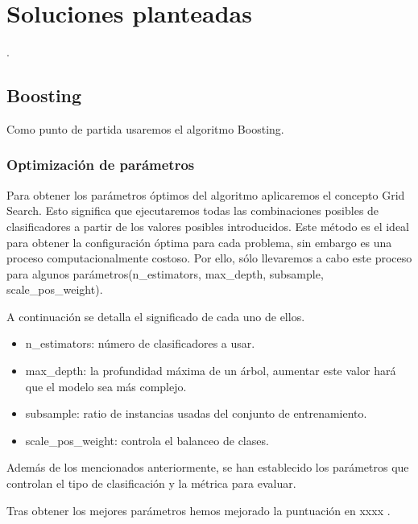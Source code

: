 \chapter{Soluciones planteadas}.
\section{Boosting}
Como punto de partida usaremos el algoritmo Boosting.
\subsection{Optimización de parámetros}
Para obtener los parámetros óptimos del algoritmo aplicaremos el concepto Grid Search. Esto significa que ejecutaremos todas las combinaciones posibles de clasificadores a partir de los valores posibles introducidos. Este método es el ideal para obtener la configuración óptima para cada problema, sin embargo es una proceso computacionalmente costoso. Por ello, sólo llevaremos a cabo este proceso para algunos parámetros(n\_estimators, max\_depth, subsample, scale\_pos\_weight).
\medskip

A continuación se detalla el significado de cada uno de ellos.
\begin{itemize}
	\item n\_estimators: número de clasificadores a usar.
	\item max\_depth: la profundidad máxima de un árbol, aumentar este valor hará que el modelo sea más complejo.
	\item subsample: ratio de instancias usadas del conjunto de entrenamiento.
	\item  scale\_pos\_weight: controla el balanceo de clases.
\end{itemize}

Además de los mencionados anteriormente, se han establecido los parámetros que controlan el tipo de clasificación y la métrica para evaluar.

Tras obtener los mejores parámetros hemos mejorado la puntuación en xxxx . 
